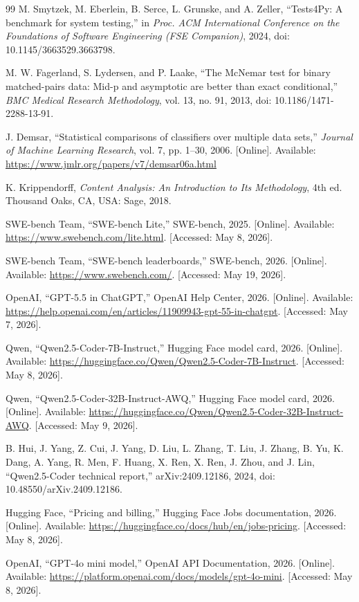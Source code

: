 \documentclass[preprint,12pt]{elsarticle}
\begin{document}
\begin{thebibliography}{99}
 M. Smytzek, M. Eberlein, B. Serce, L. Grunske, and A. Zeller, ``Tests4Py: A benchmark for system testing,'' in \textit{Proc. ACM International Conference on the Foundations of Software Engineering (FSE Companion)}, 2024, doi: 10.1145/3663529.3663798.

 M. W. Fagerland, S. Lydersen, and P. Laake, ``The McNemar test for binary matched-pairs data: Mid-p and asymptotic are better than exact conditional,'' \textit{BMC Medical Research Methodology}, vol. 13, no. 91, 2013, doi: 10.1186/1471-2288-13-91.

 J. Demsar, ``Statistical comparisons of classifiers over multiple data sets,'' \textit{Journal of Machine Learning Research}, vol. 7, pp. 1--30, 2006. [Online]. Available: \url{https://www.jmlr.org/papers/v7/demsar06a.html}

 K. Krippendorff, \textit{Content Analysis: An Introduction to Its Methodology}, 4th ed. Thousand Oaks, CA, USA: Sage, 2018.

 SWE-bench Team, ``SWE-bench Lite,'' SWE-bench, 2025. [Online]. Available: \url{https://www.swebench.com/lite.html}. [Accessed: May 8, 2026].

 SWE-bench Team, ``SWE-bench leaderboards,'' SWE-bench, 2026. [Online]. Available: \url{https://www.swebench.com/}. [Accessed: May 19, 2026].


 OpenAI, ``GPT-5.5 in ChatGPT,'' OpenAI Help Center, 2026. [Online]. Available: \url{https://help.openai.com/en/articles/11909943-gpt-55-in-chatgpt}. [Accessed: May 7, 2026].


 Qwen, ``Qwen2.5-Coder-7B-Instruct,'' Hugging Face model card, 2026. [Online]. Available: \url{https://huggingface.co/Qwen/Qwen2.5-Coder-7B-Instruct}. [Accessed: May 8, 2026].

 Qwen, ``Qwen2.5-Coder-32B-Instruct-AWQ,'' Hugging Face model card, 2026. [Online]. Available: \url{https://huggingface.co/Qwen/Qwen2.5-Coder-32B-Instruct-AWQ}. [Accessed: May 9, 2026].

 B. Hui, J. Yang, Z. Cui, J. Yang, D. Liu, L. Zhang, T. Liu, J. Zhang, B. Yu, K. Dang, A. Yang, R. Men, F. Huang, X. Ren, X. Ren, J. Zhou, and J. Lin, ``Qwen2.5-Coder technical report,'' arXiv:2409.12186, 2024, doi: 10.48550/arXiv.2409.12186.

 Hugging Face, ``Pricing and billing,'' Hugging Face Jobs documentation, 2026. [Online]. Available: \url{https://huggingface.co/docs/hub/en/jobs-pricing}. [Accessed: May 8, 2026].

 OpenAI, ``GPT-4o mini model,'' OpenAI API Documentation, 2026. [Online]. Available: \url{https://platform.openai.com/docs/models/gpt-4o-mini}. [Accessed: May 8, 2026].

\end{thebibliography}
\end{document}

